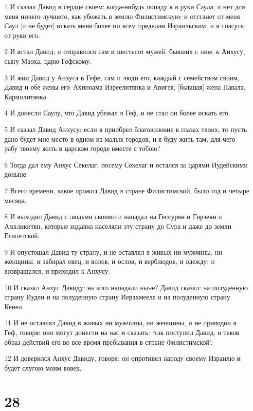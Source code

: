 \par 1 И сказал Давид в сердце своем: когда-нибудь попаду я в руки Саула, и нет для меня ничего лучшего, как убежать в землю Филистимскую; и отстанет от меня Саул [и не будет] искать меня более по всем пределам Израильским, и я спасусь от руки его.
\par 2 И встал Давид, и отправился сам и шестьсот мужей, бывших с ним, к Анхусу, сыну Маоха, царю Гефскому.
\par 3 И жил Давид у Анхуса в Гефе, сам и люди его, каждый с семейством своим, Давид и обе жены его--Ахиноама Изреелитянка и Авигея, [бывшая] жена Навала, Кармилитянка.
\par 4 И донесли Саулу, что Давид убежал в Геф, и не стал он более искать его.
\par 5 И сказал Давид Анхусу: если я приобрел благоволение в глазах твоих, то пусть дано будет мне место в одном из малых городов, и я буду жить там; для чего рабу твоему жить в царском городе вместе с тобою?
\par 6 Тогда дал ему Анхус Секелаг, посему Секелаг и остался за царями Иудейскими доныне.
\par 7 Всего времени, какое прожил Давид в стране Филистимской, было год и четыре месяца.
\par 8 И выходил Давид с людьми своими и нападал на Гессурян и Гирзеян и Амаликитян, которые издавна населяли эту страну до Сура и даже до земли Египетской.
\par 9 И опустошал Давид ту страну, и не оставлял в живых ни мужчины, ни женщины, и забирал овец, и волов, и ослов, и верблюдов, и одежду; и возвращался, и приходил к Анхусу.
\par 10 И сказал Анхус Давиду: на кого нападали ныне? Давид сказал: на полуденную страну Иудеи и на полуденную страну Иерахмеела и на полуденную страну Кенеи.
\par 11 И не оставлял Давид в живых ни мужчины, ни женщины, и не приводил в Геф, говоря: они могут донести на нас и сказать: `так поступил Давид, и таков образ действий его во все время пребывания в стране Филистимской'.
\par 12 И доверился Анхус Давиду, говоря: он опротивел народу своему Израилю и будет слугою моим вовек.

\chapter{28}

